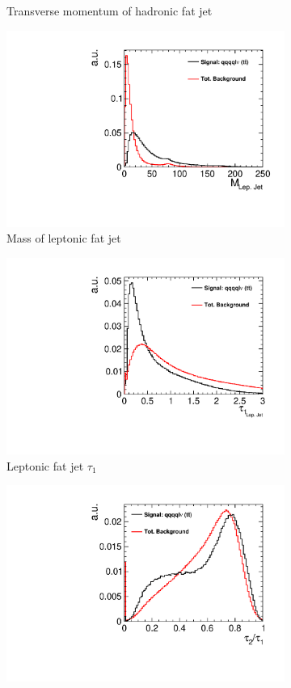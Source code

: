 \begin{figure}[]
\begin{subfigure}[b]{0.5\linewidth}
    \caption{Transverse momentum of hadronic fat jet} 
    \vspace{4ex}
  \end{subfigure}%
  \begin{subfigure}[b]{0.5\linewidth}
    \centering
    \includegraphics[width=0.75\linewidth]{TopAnalysis/figures/BDTVariables/LeptonicJetMass.pdf} 
    \caption{Mass of leptonic fat jet} 
    \vspace{4ex}
  \end{subfigure}
  \begin{subfigure}[b]{0.5\linewidth}
    \centering
    \includegraphics[width=0.75\linewidth]{TopAnalysis/figures/BDTVariables/Leptonic1SubJettiness.pdf} 
    \caption{Leptonic fat jet $\tau_1$} 
    \vspace{4ex}
  \end{subfigure}%
  \begin{subfigure}[b]{0.5\linewidth}
    \centering
    \includegraphics[width=0.75\linewidth]{TopAnalysis/figures/BDTVariables/Leptonic12Ratio.pdf} 

\end{subfigure}
\end{figure}
